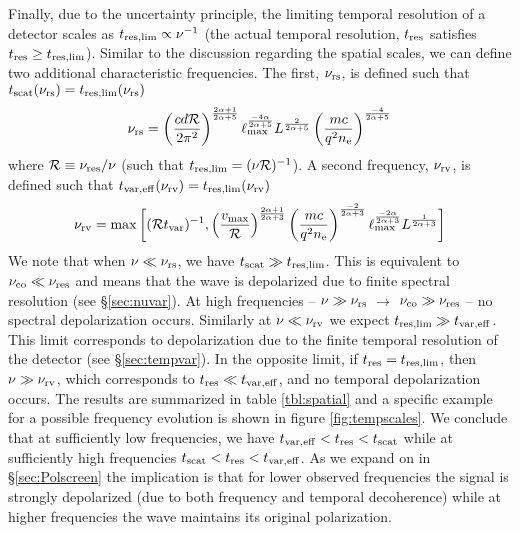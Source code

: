 \documentclass[fleqn,usenatbib]{mnras}
\begin{document}
	Finally, due to the uncertainty principle, the limiting temporal resolution of a detector scales as $t_{\rm res,lim}\propto \nu^{-1}$ (the actual temporal resolution, $t_{\rm res}$ satisfies $t_{\rm res}\geq t_{\rm res,lim}$). Similar to the discussion regarding the spatial scales, we can define two additional characteristic frequencies. The first, $\nu_{\rm rs}$, is defined such that $t_{\rm scat}(\nu_{\rm rs})=t_{\rm res,lim}(\nu_{\rm rs})$
	\begin{eqnarray}
		\label{eq:nurs}
		\nu_{\rm rs}=\left({c d \mathcal{R} \over 2\pi^2}\right)^{2\alpha+1\over 2\alpha+5} \ell_{\rm max}^{-4\alpha\over 2\alpha+5}L^{2\over 2\alpha+5} \left({m c \over q^2 n_{\rm e}}\right)^{-4\over 2\alpha+5}
	\end{eqnarray}
	where $\mathcal{R}\equiv \nu_{\rm res}/\nu$ (such that $t_{\rm res,lim}=(\nu\mathcal{R})^{-1}$).
	A second frequency, $\nu_{\rm rv}$, is defined such that $t_{\rm var,eff}(\nu_{\rm rv})=t_{\rm res,lim}(\nu_{\rm rv})$
	\begin{eqnarray}
		\label{eq:nurv}
		\nu_{\rm rv}=\max\bigg[(\mathcal{R}t_{\rm var})^{-1},\left({v_{\rm max}\over \mathcal{R}}\right)^{2\alpha+1\over 2\alpha+3} \left({m c \over q^2 n_{\rm e}}\right)^{-2\over 2\alpha+3}\ell_{\rm max}^{-2\alpha\over 2\alpha+3}L^{1\over 2\alpha+3}\bigg]
	\end{eqnarray}
	We note that when $\nu\ll \nu_{\rm rs}$, we have $t_{\rm scat}\gg t_{\rm res,lim}$. This is equivalent to $\nu_{\rm co}\ll \nu_{\rm res}$ and means that the wave is depolarized due to finite spectral resolution (see \S \ref{sec:nuvar}). At high frequencies -- $\nu\gg \nu_{\rm rs}$ $\rightarrow$ $\nu_{\rm co}\gg \nu_{\rm res}$ -- no spectral depolarization occurs. Similarly at $\nu\ll \nu_{\rm rv}$ we expect $t_{\rm res,lim}\gg t_{\rm var,eff}$. This limit corresponds to depolarization due to the finite temporal resolution of the detector (see \S \ref{sec:tempvar}). In the opposite limit, if $t_{\rm res}=t_{\rm res,lim}$, then $\nu\gg\nu_{\rm rv}$, which corresponds to $t_{\rm res}\ll t_{\rm var,eff}$, and no temporal depolarization occurs. The results are summarized in table \ref{tbl:spatial} and a specific example for a possible frequency evolution is shown in figure \ref{fig:tempscales}. We conclude that at sufficiently low frequencies, we have $t_{\rm var,eff}<t_{\rm res}<t_{\rm scat}$ while at sufficiently high frequencies $t_{\rm scat}<t_{\rm res}<t_{\rm var,eff}$. As we expand on in \S \ref{sec:Polscreen} the implication is that for lower observed frequencies the signal is strongly depolarized (due to both frequency and temporal decoherence) while at higher frequencies the wave maintains its original polarization.
	
\end{document}
